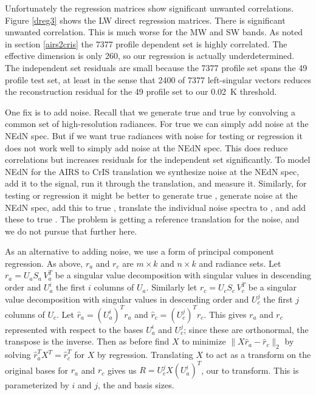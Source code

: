 \documentclass[11pt]{article}
\begin{document}
Unfortunately the regression matrices show significant unwanted
correlations.  Figure \ref{dreg3} shows the LW direct regression
matrices.  There is significant unwanted correlation.  This is much
worse for the MW and SW bands.  As noted in section \ref{airs2cris}
the 7377 profile dependent set is highly correlated.  The effective
dimension is only 260, so our regression is actually underdetermined.
The independent set residuals are small because the 7377 profile set
spans the 49 profile test set, at least in the sense that 2400 of
7377 left-singular vectors reduces the reconstruction residual for
the 49 profile set to our 0.02~K threshold.

One fix is to add noise.  Recall that we generate true {\airs} and
true {\cris} by convolving a common set of high-resolution radiances.
For true {\airs} we can simply add noise at the {\airs} NEdN spec.
But if we want true {\cris} radiances with noise for testing or
regression it does not work well to simply add noise at the {\cris}
NEdN spec.  This does reduce correlations but increases residuals for
the independent set significantly.  To model NEdN for the AIRS to
CrIS translation we synthesize noise at the {\airs} NEdN spec, add it
to the signal, run it through the translation, and measure it.
Similarly, for testing or regression it might be better to generate
true {\airs}, generate noise at the {\airs} NEdN spec, add this to
true {\airs}, translate the individual noise spectra to {\cris}, and
add these to true {\cris}.  The problem is getting a reference
translation for the noise, and we do not pursue that further here.

As an alternative to adding noise, we use a form of principal
component regression.  As above, $r_a$ and $r_c$ are $m \times k$
and $n \times k$ {\airs} and {\cris} radiance sets.  Let $r_a = U_a
S_a\,V_a^T$ be a singular value decomposition with singular values
in descending order and $U_a^i$ the first $i$ columns of $U_a$.
Similarly let $r_c = U_c S_c\,V_c^T$ be a singular value
decomposition with singular values in descending order and $U_c^j$
the first $j$ columns of $U_c$.  Let $\hat r_a = (U_a^i)^T r_a$ and
$\hat r_c = (U_c^j)^T r_c$.  This gives $r_a$ and $r_c$ represented
with respect to the bases $U_a^i$ and $U_c^j$; since these are
orthonormal, the transpose is the inverse.  Then as before find $X$
to minimize $\|X \hat r_a - \hat r_c\|_2$ by solving $\hat r_a^T X^T
= \hat r_c^T$ for $X$ by regression.  Translating $X$ to act as a
transform on the original bases for $r_a$ and $r_c$ gives us $R =
U_c^j X (U_a^i)^T$, our {\airs} to {\cris} transform.  This is
parameterized by $i$ and $j$, the {\airs} and {\cris} basis sizes.
\end{document}
